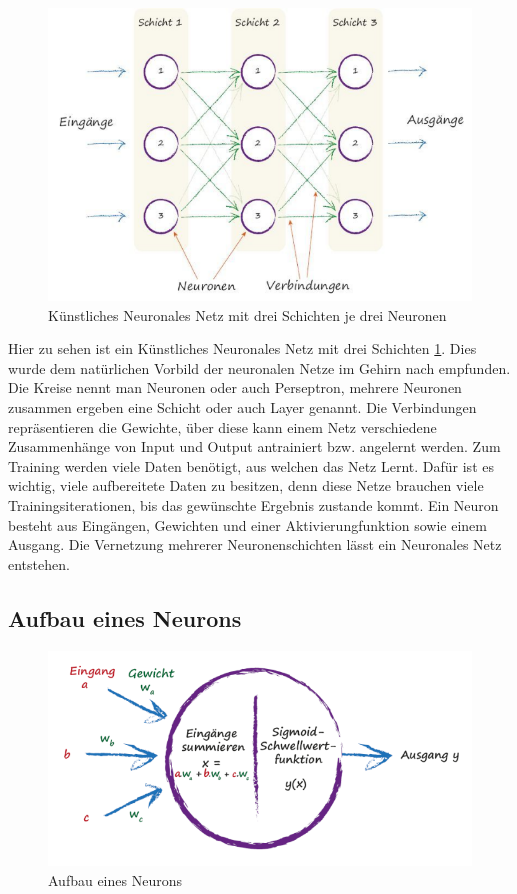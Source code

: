 \begin{figure}[htb]
  \centering  
  \includegraphics[scale=0.5]{img/S36_Buildyourown.png}
  \caption{Künstliches Neuronales Netz mit drei Schichten je drei Neuronen \cite{Rashid2017} }
  \label{fig:neural_network}
\end{figure}


Hier zu sehen ist ein Künstliches Neuronales Netz mit drei Schichten \ref{fig:neural_network}. Dies wurde dem natürlichen Vorbild der neuronalen Netze im Gehirn nach empfunden. Die Kreise nennt man Neuronen oder auch Perseptron, mehrere Neuronen zusammen ergeben eine Schicht oder auch Layer genannt. Die Verbindungen repräsentieren die Gewichte, über diese kann einem Netz verschiedene Zusammenhänge von Input und Output antrainiert bzw. angelernt werden. Zum Training werden viele Daten benötigt, aus welchen das Netz \glqq Lernt\grqq{}. Dafür ist es wichtig, viele aufbereitete Daten zu besitzen, denn diese Netze brauchen viele Trainingsiterationen, bis das gewünschte Ergebnis zustande kommt. Ein Neuron besteht aus Eingängen, Gewichten und einer Aktivierungfunktion sowie einem Ausgang. Die Vernetzung mehrerer Neuronenschichten lässt ein Neuronales Netz entstehen.

\newpage



\subsection{Aufbau eines Neurons}
\begin{figure}[htb]
  \centering  
  \includegraphics[scale=0.5]{img/S41_Buildyourown.png}
  \caption{Aufbau eines Neurons \cite{Rashid2017}}
  \label{fig:neuron}
  

\end{figure}
